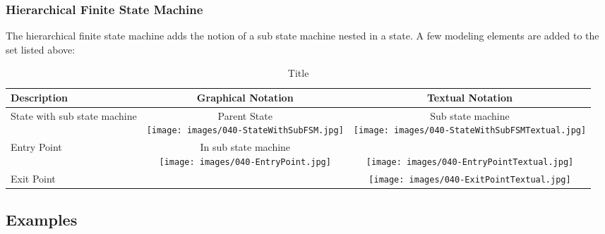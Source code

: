 \subsubsection{Hierarchical Finite State Machine}

The hierarchical finite state machine adds the notion of a sub state machine nested in a state.
A few modeling elements are added to the set listed above:

\begin{table}
\caption{Title}
\begin{tabular}{|b{3cm}|c|c|}
\hline
 \textbf{Description} & \textbf{Graphical Notation} & \textbf{Textual Notation} \\ \hline
 State with sub state machine & \specialcell{Parent State \\ \texttt{[image: images/040-StateWithSubFSM.jpg]}} & \specialcell{Sub state machine \\ \texttt{[image: images/040-StateWithSubFSMTextual.jpg]}} \\ \hline
 Entry Point & \specialcell{In sub state machine \\ \texttt{[image: images/040-EntryPoint.jpg]}} & \specialcell{ \\ \texttt{[image: images/040-EntryPointTextual.jpg]}} \\ \hline
 Exit Point & & \texttt{[image: images/040-ExitPointTextual.jpg]} \\ \hline
\end{tabular}
\end{table}



\subsection{Examples}

